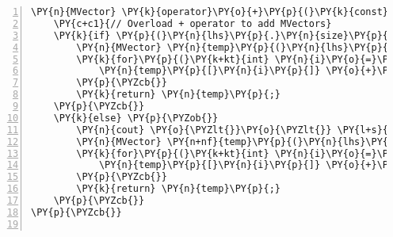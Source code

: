 \begin{Verbatim}[tabsize=2,commandchars=\\\{\},numbers=left,firstnumber=1,stepnumber=1]
\PY{n}{MVector} \PY{k}{operator}\PY{o}{+}\PY{p}{(}\PY{k}{const} \PY{n}{MVector}\PY{o}{\PYZam{}} \PY{n}{lhs}\PY{p}{,} \PY{k}{const} \PY{n}{MVector}\PY{o}{\PYZam{}} \PY{n}{rhs}\PY{p}{)} \PY{p}{\PYZob{}}
	\PY{c+c1}{// Overload + operator to add MVectors}
	\PY{k}{if} \PY{p}{(}\PY{n}{lhs}\PY{p}{.}\PY{n}{size}\PY{p}{(}\PY{p}{)} \PY{o}{=}\PY{o}{=} \PY{n}{rhs}\PY{p}{.}\PY{n}{size}\PY{p}{(}\PY{p}{)}\PY{p}{)}\PY{p}{\PYZob{}} \PY{c+c1}{// Give a warning if the vectors are of difference size,}
		\PY{n}{MVector} \PY{n}{temp}\PY{p}{(}\PY{n}{lhs}\PY{p}{)}\PY{p}{;} \PY{c+c1}{// to state that the operation might not give the expected result.}
		\PY{k}{for}\PY{p}{(}\PY{k+kt}{int} \PY{n}{i}\PY{o}{=}\PY{l+m+mi}{0}\PY{p}{;} \PY{n}{i}\PY{o}{\PYZlt{}}\PY{n}{temp}\PY{p}{.}\PY{n}{size}\PY{p}{(}\PY{p}{)}\PY{p}{;} \PY{n}{i}\PY{o}{+}\PY{o}{+}\PY{p}{)} \PY{p}{\PYZob{}}
			\PY{n}{temp}\PY{p}{[}\PY{n}{i}\PY{p}{]} \PY{o}{+}\PY{o}{=} \PY{n}{rhs}\PY{p}{[}\PY{n}{i}\PY{p}{]}\PY{p}{;}
		\PY{p}{\PYZcb{}}
		\PY{k}{return} \PY{n}{temp}\PY{p}{;}
	\PY{p}{\PYZcb{}}
	\PY{k}{else} \PY{p}{\PYZob{}}
		\PY{n}{cout} \PY{o}{\PYZlt{}}\PY{o}{\PYZlt{}} \PY{l+s}{\PYZdq{}}\PY{l+s}{Warning: The vectors are of different sizes! This could be very bad.}\PY{l+s}{\PYZdq{}} \PY{o}{\PYZlt{}}\PY{o}{\PYZlt{}} \PY{n}{endl}\PY{p}{;}
		\PY{n}{MVector} \PY{n+nf}{temp}\PY{p}{(}\PY{n}{lhs}\PY{p}{)}\PY{p}{;}
		\PY{k}{for}\PY{p}{(}\PY{k+kt}{int} \PY{n}{i}\PY{o}{=}\PY{l+m+mi}{0}\PY{p}{;} \PY{n}{i}\PY{o}{\PYZlt{}}\PY{n}{temp}\PY{p}{.}\PY{n}{size}\PY{p}{(}\PY{p}{)}\PY{p}{;} \PY{n}{i}\PY{o}{+}\PY{o}{+}\PY{p}{)} \PY{p}{\PYZob{}}
			\PY{n}{temp}\PY{p}{[}\PY{n}{i}\PY{p}{]} \PY{o}{+}\PY{o}{=} \PY{n}{rhs}\PY{p}{[}\PY{n}{i}\PY{p}{]}\PY{p}{;}
		\PY{p}{\PYZcb{}}
		\PY{k}{return} \PY{n}{temp}\PY{p}{;}
	\PY{p}{\PYZcb{}}
\PY{p}{\PYZcb{}}


\end{Verbatim}
